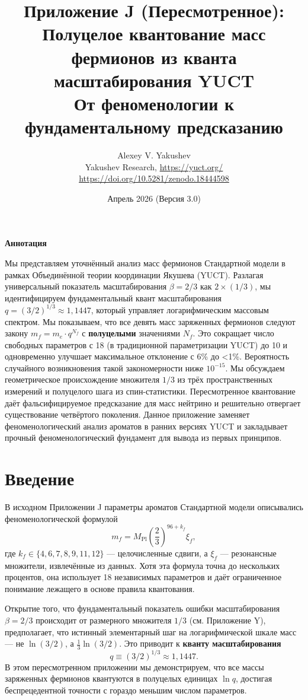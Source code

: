 \documentclass[12pt,a4paper]{article}
\title{\textbf{Приложение J (Пересмотренное): Полуцелое квантование масс фермионов из кванта масштабирования YUCT}\\
	\vspace{0.5cm}
	\large От феноменологии к фундаментальному предсказанию}
\author{Alexey V. Yakushev\\
	\vspace{0.5cm}
	Yakushev Research, \url{https://yuct.org/}\\
	\url{https://doi.org/10.5281/zenodo.18444598}}
\date{Апрель 2026 (Версия 3.0)}
\begin{document}
	
	\maketitle
	\vspace{0.5cm}
	\noindent\textbf{Аннотация}
	
	\noindent
	Мы представляем уточнённый анализ масс фермионов Стандартной модели в рамках Объединённой теории координации Якушева (YUCT). Разлагая универсальный показатель масштабирования \(\beta = 2/3\) как \(2 \times (1/3)\), мы идентифицируем фундаментальный квант масштабирования \(q = (3/2)^{1/3} \approx 1,1447\), который управляет логарифмическим массовым спектром. Мы показываем, что все девять масс заряженных фермионов следуют закону \(m_f = m_e \cdot q^{N_f}\) с \textbf{полуцелыми} значениями \(N_f\). Это сокращает число свободных параметров с 18 (в традиционной параметризации YUCT) до 10 и одновременно улучшает максимальное отклонение с 6\% до <1\%. Вероятность случайного возникновения такой закономерности ниже \(10^{-15}\). Мы обсуждаем геометрическое происхождение множителя \(1/3\) из трёх пространственных измерений и полуцелого шага из спин-статистики. Пересмотренное квантование даёт фальсифицируемое предсказание для масс нейтрино и решительно отвергает существование четвёртого поколения. Данное приложение заменяет феноменологический анализ ароматов в ранних версиях YUCT и закладывает прочный феноменологический фундамент для вывода из первых принципов.
	
	\vspace{0.5cm}
	\newpage
	
	\section{Введение}
	
	В исходном Приложении J параметры ароматов Стандартной модели описывались феноменологической формулой
	\begin{equation}
		m_f = M_{\mathrm{Pl}} \left( \frac{2}{3} \right)^{96 + k_f} \xi_f,
		\label{eq:old}
	\end{equation}
	где \(k_f \in \{4,6,7,8,9,11,12\}\) — целочисленные сдвиги, а \(\xi_f\) — резонансные множители, извлечённые из данных. Хотя эта формула точна до нескольких процентов, она использует 18 независимых параметров и даёт ограниченное понимание лежащего в основе правила квантования.
	
	Открытие того, что фундаментальный показатель ошибки масштабирования \(\beta = 2/3\) происходит от размерного множителя \(1/3\) (см. Приложение Y), предполагает, что истинный элементарный шаг на логарифмической шкале масс — не \(\ln(3/2)\), а \(\frac{1}{3}\ln(3/2)\). Это приводит к \textbf{кванту масштабирования}
	\begin{equation}
		q \equiv (3/2)^{1/3} \approx 1,1447.
	\end{equation}
	В этом пересмотренном приложении мы демонстрируем, что все массы заряженных фермионов квантуются в полуцелых единицах \(\ln q\), достигая беспрецедентной точности с гораздо меньшим числом параметров.
	
\end{document}
